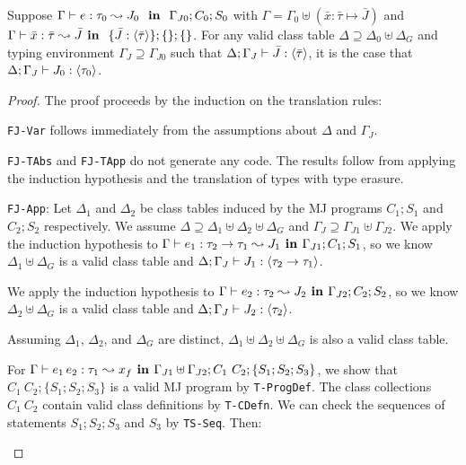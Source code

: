 \begin{theorem}
Suppose $\Gamma \vdash e : \tau_0 \leadsto J_0~\textbf{~in~}~\Gamma_{J0};C_0;S_0$ with 
$\Gamma = \Gamma_0 \uplus (\bar{x}:\bar{\tau}\mapsto \bar{J})$ and 
$\Gamma \vdash \bar{x}:\bar{\tau} \leadsto \bar{J} \textbf{~in~}~\{\bar{J}:\langle\bar{\tau}\rangle\};\{\};\{\}$.
For any valid class table $\Delta \supseteq \Delta_0 \uplus \Delta_G$ and typing environment
$\Gamma_J \supseteq \Gamma_{J0}$ such that 
$\Delta;\Gamma_J \vdash \bar{J} : \langle\bar{\tau}\rangle$,
it is the case that $\Delta;\Gamma_J \vdash J_0 : \langle\tau_0\rangle$.
\end{theorem}

\begin{proof}
The proof proceeds by the induction on the translation rules:

\begin{case}{\texttt{FJ-Var}}
 follows immediately from the assumptions about $\Delta$ and $\Gamma_J$.
\end{case}

\begin{mcase}{\texttt{FJ-TAbs} and \texttt{FJ-TApp}}
 do not generate any code. The results follow from applying the induction hypothesis
and the translation of types with type erasure.
\end{mcase}

\begin{case}{\texttt{FJ-App}}: 
Let $\Delta_1$ and $\Delta_2$ be class tables induced by the MJ programs $C_1;S_1$
and $C_2;S_2$ respectively. We assume
  $\Delta \supseteq \Delta_1 \uplus \Delta_2 \uplus \Delta_G$
and $\Gamma_J \supseteq \Gamma_{J1} \uplus \Gamma_{J2}$.
We apply the induction hypothesis to $\Gamma \vdash e_1 : \tau_2 \rightarrow \tau_1
  \leadsto J_1 \textbf{~in~} \Gamma_{J1};C_1;S_1$, so we know 
  $\Delta_1 \uplus \Delta_G$ is a valid class table and $\Delta; \Gamma_J \vdash J_1 : \langle\tau_2 \rightarrow \tau_1\rangle$.

We apply the induction hypothesis to $\Gamma \vdash e_2 : \tau_2 \leadsto J_2 \textbf{~in~} \Gamma_{J2};C_2;S_2$,
so we know $\Delta_2 \uplus \Delta_G$ is a valid class table
and $\Delta; \Gamma_J \vdash J_2 : \langle\tau_2\rangle$.

Assuming $\Delta_1$, $\Delta_2$, and $\Delta_G$ are distinct,  
$\Delta_1 \uplus \Delta_2 \uplus \Delta_G$ is also a valid class table.

For $\Gamma \vdash e_1 \, e_2 : \tau_1 \leadsto x_f \textbf{~in~} 
\Gamma_{J1} \uplus \Gamma_{J2};C_1~C_2;\{S_1;S_2;S_3\}$, we
show that $C_1~C_2;\{S_1;S_2;S_3\}$ is a valid MJ program by \texttt{T-ProgDef}.
The class collections $C_1~C_2$ contain valid class definitions by \texttt{T-CDefn}.
We can check the sequences of statements $S_1;S_2;S_3$ and $S_3$ by \texttt{TS-Seq}.
Then:


\end{case}
\end{proof}
